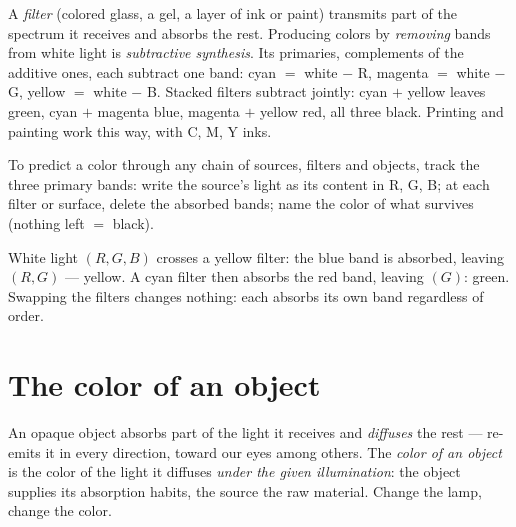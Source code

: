 \begin{definition}\label{def:g11:color-light-sources:subtractive}
A \emph{filter} (colored glass, a gel, a layer of ink or
paint) transmits part of the spectrum it receives and absorbs the rest.
Producing colors by \emph{removing} bands from white light is
\emph{subtractive synthesis}. Its
primaries, complements of the additive ones, each subtract one band:
cyan $=$ white $-$ R, magenta $=$ white $-$ G, yellow $=$ white $-$ B.
Stacked filters subtract jointly: cyan $+$ yellow leaves green, cyan
$+$ magenta blue, magenta $+$ yellow red, all three black. Printing
and painting work this way, with C, M, Y inks.
\end{definition}

\begin{method}\label{met:g11:color-light-sources:bookkeeping}
To predict a color through any chain of sources, filters and objects,
track the three primary bands: write the source's light as its content
in R, G, B; at each filter or surface, delete the absorbed bands; name
the color of what survives (nothing left $=$ black).
\end{method}

\begin{example}\label{ex:g11:color-light-sources:chain}
White light $(R, G, B)$ crosses a yellow filter: the blue band is
absorbed, leaving $(R, G)$ --- yellow. A cyan filter then absorbs the
red band, leaving $(G)$: green. Swapping the filters changes nothing:
each absorbs its own band regardless of order.
\end{example}

\section{The color of an object}

\begin{definition}\label{def:g11:color-light-sources:objectcolor}
An opaque object absorbs part of the light it receives and
\emph{diffuses} the rest --- re-emits it in every
direction, toward our eyes among others. The \emph{color of an
object} is the color of the light it diffuses
\emph{under the given illumination}: the object supplies its absorption
habits, the source the raw material. Change the lamp, change the color.
\end{definition}

